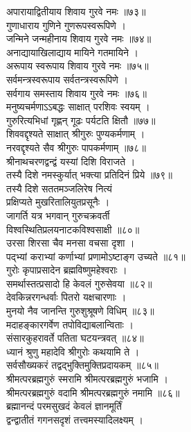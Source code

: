 अपारायाद्वितीयाय शिवाय गुरवे नमः ॥७३॥\\
गुणाधाराय गुणिने गुणरूपस्वरूपिणे ।\\
जन्मिने जन्महीनाय शिवाय गुरवे नमः ॥७४॥\\
अनाद्यायाखिलाद्याय मायिने गतमायिने ।\\
अरूपाय स्वरूपाय शिवाय गुरवे नमः ॥७५॥\\
सर्वमन्त्रस्वरूपाय सर्वतन्त्रस्वरूपिणे ।\\
सर्वगाय समस्ताय शिवाय गुरवे नमः ॥७६॥\\
मनुष्यचर्मणाऽऽबद्धः साक्षात् परशिवः स्वयम् ।\\
गुरुरित्यभिधां गृह्णन् गूढः पर्यटति क्षितौ ॥७७॥\\
शिववद्दृश्यते साक्षात् श्रीगुरुः पुण्यकर्मणाम् ।\\
नरवद्दृश्यते सैव श्रीगुरुः पापकर्मणाम् ॥७८॥\\
श्रीनाथचरणद्वन्द्वं यस्यां दिशि विराजते ।\\
तस्यै दिशे नमस्कुर्यात्  भक्त्या प्रतिदिनं प्रिये ॥७९॥\\
तस्यै दिशे सततमञ्जलिरेष नित्यं\\
प्रक्षिप्यते मुखरितालियुतप्रसूनैः ।\\
जागर्ति यत्र भगवान् गुरुचक्रवर्ती\\
विश्वस्थितिप्रलयनाटकविश्वसाक्षी ॥८०॥\\
उरसा शिरसा चैव मनसा वचसा दृशा ।\\
पद्‍भ्यां कराभ्यां कर्णाभ्यां प्रणामोऽष्टाङ्ग उच्यते ॥८१॥\\
गुरोः कृपाप्रसादेन ब्रह्मविष्णुमहेश्वराः ।\\
समर्थास्तत्प्रसादो हि केवलं गुरुसेवया ॥८२॥\\
देवकिन्नरगन्धर्वाः पितरो यक्षचारणाः ।\\
मुनयो नैव जानन्ति गुरुशुश्रूषणे विधिम् ॥८३॥\\
मदाहङ्कारगर्वेण तपोविद्याबलान्विताः ।\\
संसारकुहरावर्ते पतिता घटयन्त्रवत् ॥८४॥\\
ध्यानं श्रुणु महादेवि श्रीगुरोः कथयामि ते ।\\
सर्वसौख्यकरं तद्वद्भुक्तिमुक्तिप्रदायकम् ॥८५॥\\
श्रीमत्परब्रह्मगुरुं स्मरामि श्रीमत्परब्रह्मगुरुं भजामि ।\\
श्रीमत्परब्रह्मगुरुं वदामि श्रीमत्परब्रह्मगुरुं नमामि ॥८६॥\\
ब्रह्मानन्दं परमसुखदं केवलं ज्ञानमूर्तिं\\
द्वन्द्वातीतं गगनसदृशं तत्त्वमस्यादिलक्ष्यम् ।\\
